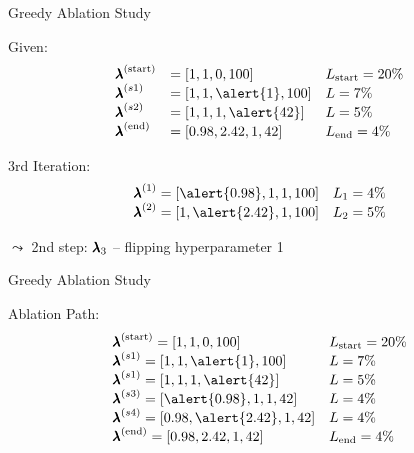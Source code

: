 \begin{frame}[c]{Greedy Ablation Study}

Given:
\begin{eqnarray}
\begin{array}{lll}
\confI{\text{start}} &= [1, 1, 0, 100] & \loss_{\text{start}} = 20\% \nonumber\\
\confI{s1} &= [1, 1, \alert{1}, 100]  & \loss = 7\% \nonumber\\
\confI{s2} &= [1, 1, 1, \alert{42}]  & \loss = 5\% \nonumber\\
\confI{\text{end}} &= [0.98, 2.42, 1, 42]  & \loss_{\text{end}} = 4\% \nonumber
\end{array}
\end{eqnarray}

3rd Iteration:
\begin{eqnarray}
\begin{array}{ll}
\confI1 = [\alert{0.98}, 1, 1, 100] & \loss_1 = 4\% \nonumber\\
\confI2 = [1, \alert{2.42}, 1, 100] & \loss_2 = 5\% \nonumber\\
\end{array}
\end{eqnarray}

$\leadsto$ 2nd step: $\pmb{\lambda}_3$ -- flipping hyperparameter 1

\end{frame}
\begin{frame}[c]{Greedy Ablation Study}

Ablation Path:
\begin{eqnarray}
\begin{array}{ll}
\confI{\text{start}} = [1, 1, 0, 100] & \loss_{\text{start}} = 20\% \nonumber\\
\confI{s1} = [1, 1, \alert{1}, 100]  & \loss = 7\% \nonumber\\
\confI{s1} = [1, 1, 1, \alert{42}]  & \loss = 5\% \nonumber\\
\confI{s3} = [\alert{0.98}, 1, 1, 42] & \loss = 4\% \nonumber\\
\confI{s4} = [0.98, \alert{2.42}, 1, 42] & \loss = 4\% \nonumber\\
\confI{\text{end}} = [0.98, 2.42, 1, 42]  & \loss_{\text{end}} = 4\% \nonumber
\end{array}
\end{eqnarray}

\end{frame}
